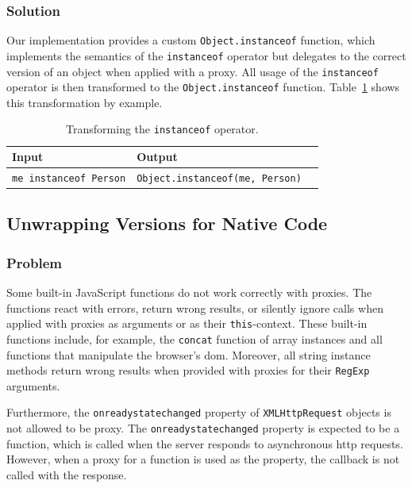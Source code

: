 \subsubsection{Solution}

Our implementation provides a custom \lstinline{Object.instanceof} function, which implements the semantics of the \lstinline{instanceof} operator but delegates to the correct version of an object when applied with a proxy.
All usage of the \lstinline{instanceof} operator is then transformed to the \lstinline{Object.instanceof} function.
Table~\ref{table:transformingInstanceof} shows this transformation by example.

\begin{table}[h]
\begin{center}
\begin{tabular}{| l | l | l |}
\hline
Input & Output \\ \hline
\lstinline|me instanceof Person| & \lstinline|Object.instanceof(me, Person)| \\ \hline
\end{tabular}
\end{center}
\caption[Table caption text]{Transforming the \lstinline{instanceof} operator.}
\label{table:transformingInstanceof}
\end{table}



\subsection{Unwrapping Versions for Native Code} \label{subsec:IMPLEMENTATION:4.3}


\subsubsection{Problem}

Some built-in JavaScript functions do not work correctly with proxies.
The functions react with errors, return wrong results, or silently ignore calls when applied with proxies as arguments or as their \lstinline{this}-context.
These built-in functions include, for example, the \lstinline{concat} function of array instances and all functions that manipulate the browser's \ac{dom}.
Moreover, all string instance methods return wrong results when provided with proxies for their \lstinline{RegExp} arguments.

Furthermore, the \lstinline{onreadystatechanged} property of \lstinline{XMLHttpRequest} objects is not allowed to be proxy.
The \lstinline{onreadystatechanged} property is expected to be a function, which is called when the server responds to asynchronous \ac{http} requests. 
However, when a proxy for a function is used as the property, the callback is not called with the response.


